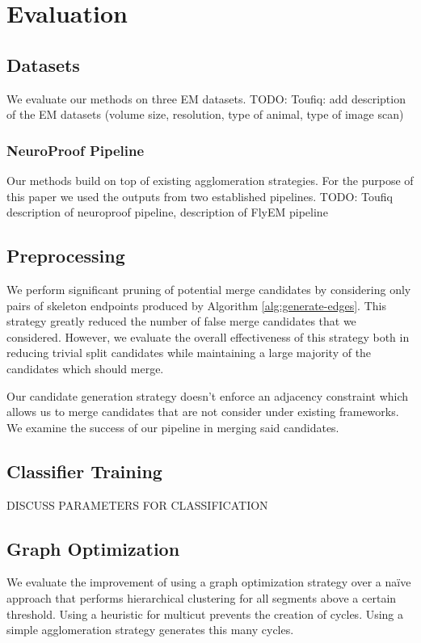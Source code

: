\section{Evaluation}

\subsection{Datasets}

We evaluate our methods on three EM datasets. 
TODO: Toufiq: add description of the EM datasets (volume size, resolution, type of animal, type of image scan)

\subsubsection{NeuroProof Pipeline}
\label{sec:neuroproof}
Our methods build on top of existing agglomeration strategies. For the purpose of this paper we used the outputs from two established pipelines. 
TODO: Toufiq description of neuroproof pipeline, description of FlyEM pipeline

\subsection{Preprocessing}

We perform significant pruning of potential merge candidates by considering only pairs of skeleton endpoints produced by Algorithm \ref{alg:generate-edges}. This strategy greatly reduced the number of false merge candidates that we considered. However, we evaluate the overall effectiveness of this strategy both in reducing trivial split candidates while maintaining a large majority of the candidates which should merge.

Our candidate generation strategy doesn't enforce an adjacency constraint which allows us to merge candidates that are not consider under existing frameworks. We examine the success of our pipeline in merging said candidates. 

\subsection{Classifier Training}

DISCUSS PARAMETERS FOR CLASSIFICATION

\subsection{Graph Optimization}

We evaluate the improvement of using a graph optimization strategy over a na\"ive approach that performs hierarchical clustering for all segments above a certain threshold.
Using a heuristic for multicut prevents the creation of cycles. 
Using a simple agglomeration strategy generates this many cycles. 